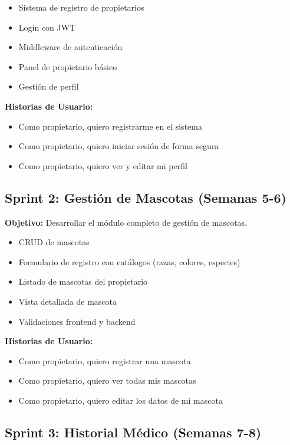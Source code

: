 \begin{itemize}
    \item Sistema de registro de propietarios
    \item Login con JWT
    \item Middleware de autenticación
    \item Panel de propietario básico
    \item Gestión de perfil
\end{itemize}

\textbf{Historias de Usuario:}
\begin{itemize}
    \item Como propietario, quiero registrarme en el sistema
    \item Como propietario, quiero iniciar sesión de forma segura
    \item Como propietario, quiero ver y editar mi perfil
\end{itemize}

\subsection{Sprint 2: Gestión de Mascotas (Semanas 5-6)}

\textbf{Objetivo:} Desarrollar el módulo completo de gestión de mascotas.

\begin{itemize}
    \item CRUD de mascotas
    \item Formulario de registro con catálogos (razas, colores, especies)
    \item Listado de mascotas del propietario
    \item Vista detallada de mascota
    \item Validaciones frontend y backend
\end{itemize}

\textbf{Historias de Usuario:}
\begin{itemize}
    \item Como propietario, quiero registrar una mascota
    \item Como propietario, quiero ver todas mis mascotas
    \item Como propietario, quiero editar los datos de mi mascota
\end{itemize}

\subsection{Sprint 3: Historial Médico (Semanas 7-8)}

